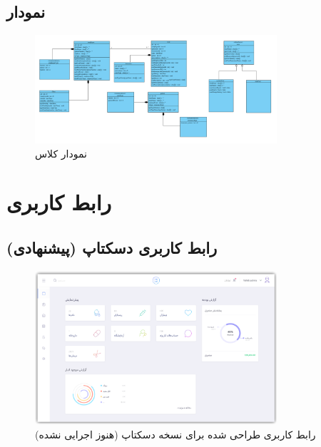\documentclass[a4paper,12pt]{report}
\begin{document}
	\section{
		نمودار 
		}\label{sec3:chap2}

	\begin{figure}[!h]
		\label{fig1:sec3:chap2}
		\begin{center}
			\includegraphics[width=0.8\textwidth]{diagrams/classDiagram.pdf}
			\caption{نمودار کلاس}
		\end{center}
	\end{figure}

	\chapter{
		رابط کاربری}
	\label{chp3}
	\section{
	رابط کاربری دسکتاپ (پیشنهادی)
	}\label{sec1:chap3}

	\begin{figure}[!h]
		\label{fig1:sec1:chap3}
		\begin{center}
			\includegraphics[width=0.8\textwidth]{UI/Desktop-UI.pdf}
			\caption{
			رابط کاربری طراحی شده برای نسخه دسکتاپ (هنوز اجرایی نشده)
			}
		\end{center}
	\end{figure}
\end{document}
